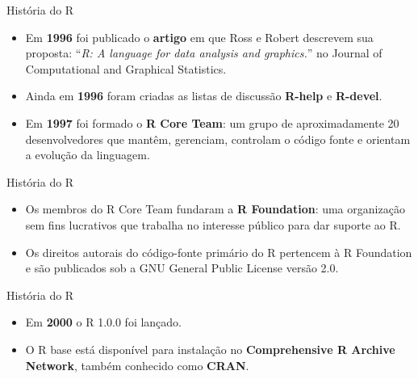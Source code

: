 \documentclass[
  ignorenonframetext,
  serif,
  professionalfont,
  usenames,
  dvipsnames,
  aspectratio = 169]{beamer}
\def\beginAHalfColumn{\begin{minipage}{0.49\textwidth}}%
\def\endColumns{\end{minipage}}%
\begin{document}
\begin{frame}{História do R}
\protect\hypertarget{histuxf3ria-do-r-1}{}
\beginAHalfColumn

\begin{itemize}
\item
  Em \textbf{1996} foi publicado o \textbf{artigo} em que Ross e Robert
  descrevem sua proposta:
  ``\emph{R: A language for data analysis and graphics.}'' no Journal of
  Computational and Graphical Statistics.
\item
  Ainda em \textbf{1996} foram criadas as listas de discussão
  \textbf{R-help} e \textbf{R-devel}.
\item
  Em \textbf{1997} foi formado o \textbf{R Core Team}: um grupo de
  aproximadamente 20 desenvolvedores que mantêm, gerenciam, controlam o
  código fonte e orientam a evolução da linguagem.
\end{itemize}

\endColumns
\beginAHalfColumn

\endColumns
\end{frame}

\begin{frame}{História do R}
\protect\hypertarget{histuxf3ria-do-r-2}{}
\beginAHalfColumn

\begin{itemize}
\item
  Os membros do R Core Team fundaram a \textbf{R Foundation}: uma
  organização sem fins lucrativos que trabalha no interesse público para
  dar suporte ao R.
\item
  Os direitos autorais do código-fonte primário do R pertencem à R
  Foundation e são publicados sob a GNU General Public License versão
  2.0.
\end{itemize}

\endColumns
\beginAHalfColumn

\endColumns
\end{frame}

\begin{frame}{História do R}
\protect\hypertarget{histuxf3ria-do-r-3}{}
\beginAHalfColumn

\begin{itemize}
\item
  Em \textbf{2000} o R 1.0.0 foi lançado.
\item
  O R base está disponível para instalação no
  \textbf{Comprehensive R Archive Network}, também conhecido como
  \textbf{CRAN}.
\end{itemize}

\endColumns
\beginAHalfColumn

\endColumns
\end{frame}
\end{document}
